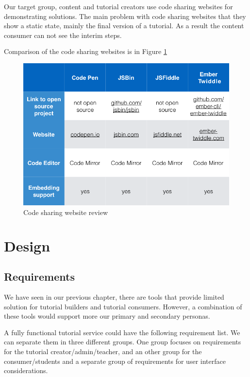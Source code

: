 \documentclass[11pt, a4paper, oneside, openright, medskipamount]{report}
\begin{document}
Our target group, content and tutorial creators use code sharing websites for demonstrating solutions. The main problem with code sharing websites that they show a static state, mainly the final version of a tutorial. As a result the content consumer can not see the interim steps.

Comparison of the code sharing websites is in Figure \ref{fig:code-sharing-website-review}

\begin{figure}[ht]
\centering
\includegraphics[width=1\textwidth]{assets/code-sharing-website-review}
\caption{Code sharing website review}
\label{fig:code-sharing-website-review}
\end{figure}

\chapter{Design}

\section{Requirements}

We have seen in our previous chapter, there are tools that provide limited solution for tutorial builders and tutorial consumers. However, a combination of these tools would support more our primary and secondary personas.

A fully functional tutorial service could have the following requirement list. We can separate them in three different groups. One group focuses on requirements for the tutorial creator/admin/teacher, and an other group for the consumer/students and a separate group of requirements for user interface considerations.
\end{document}

